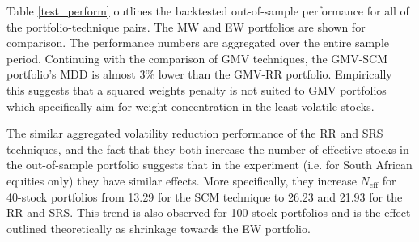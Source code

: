 \documentclass[a4paper,11pt,nocenter,bold,noupper,headcount]{mythesis}
\theoremstyle{plain}
\theoremstyle{definition}
\begin{document}
Table \ref{test_perform} outlines the backtested out-of-sample performance for all of the portfolio-technique pairs. The MW and EW portfolios are shown for comparison. The performance numbers are aggregated over the entire sample period. Continuing with the comparison of GMV techniques, the GMV-SCM portfolio's MDD is almost $3\%$ lower than the GMV-RR portfolio. Empirically this suggests that a squared weights penalty is not suited to GMV portfolios which specifically aim for weight concentration in the least volatile stocks.

The similar aggregated volatility reduction performance of the RR and SRS techniques, and the fact that they both increase the number of effective stocks in the out-of-sample portfolio suggests that in the experiment (i.e. for South African equities only) they have similar effects. More specifically, they increase $N_{\text{eff}}$ for 40-stock portfolios from 13.29 for the SCM technique to 26.23 and 21.93 for the RR and SRS. This trend is also observed for 100-stock portfolios and is the effect outlined theoretically as shrinkage towards the EW portfolio.
\end{document}
